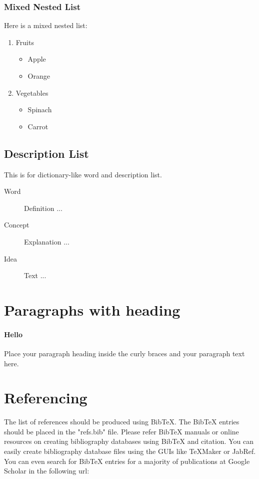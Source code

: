 \documentclass[fleqn, 11pt, twoside]{IOEGC2019}
\begin{document}
\subsubsection{Mixed Nested List}
Here is a mixed nested list:
\begin{enumerate}[noitemsep]
  \item Fruits
    \begin{itemize}[noitemsep] 
      \item Apple
      \item Orange
    \end{itemize}
  \item Vegetables
    \begin{itemize}[noitemsep] 
      \item Spinach
      \item Carrot
    \end{itemize}
\end{enumerate}


\subsection{Description List}
This is for dictionary-like word and description list.
\begin{description}
  \item[Word] Definition ...
  \item[Concept] Explanation ...
  \item[Idea] Text ...
\end{description}


\section{Paragraphs with heading}

\paragraph{Hello} Place your paragraph heading inside the curly braces and your 
paragraph text here.


\section{Referencing}
The list of references should be produced using BibTeX. The BibTeX entries 
should be placed in the "refs.bib" file. Please refer BibTeX manuals or online 
resources on creating bibliography databases using BibTeX and citation. You can 
easily create bibliography database files using the GUIs like TeXMaker or JabRef. 
You can even search for BibTeX entries for a majority of publications at Google 
Scholar in the following url: 
\end{document}
